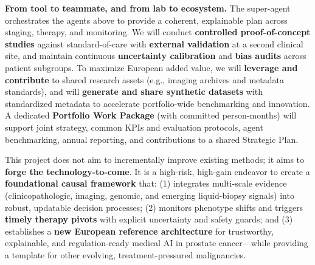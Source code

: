 \documentclass[11pt, a4paper]{article}
\begin{document}
\textbf{From tool to teammate, and from lab to ecosystem.} The super-agent orchestrates the agents above to provide a coherent, explainable plan across staging, therapy, and monitoring. We will conduct \textbf{controlled proof-of-concept studies} against standard-of-care with \textbf{external validation} at a second clinical site, and maintain continuous \textbf{uncertainty calibration} and \textbf{bias audits} across patient subgroups. To maximize European added value, we will \textbf{leverage and contribute} to shared research assets (e.g., imaging archives and metadata standards), and will \textbf{generate and share synthetic datasets} with standardized metadata to accelerate portfolio-wide benchmarking and innovation. A dedicated \textbf{Portfolio Work Package} (with committed person-months) will support joint strategy, common KPIs and evaluation protocols, agent benchmarking, annual reporting, and contributions to a shared Strategic Plan.

This project does not aim to incrementally improve existing methods; it aims to \textbf{forge the technology-to-come}. It is a high-risk, high-gain endeavor to create a \textbf{foundational causal framework} that: (1) integrates multi-scale evidence (clinicopathologic, imaging, genomic, and emerging liquid-biopsy signals) into robust, updatable decision processes; (2) monitors phenotype shifts and triggers \textbf{timely therapy pivots} with explicit uncertainty and safety guards; and (3) establishes a \textbf{new European reference architecture} for trustworthy, explainable, and regulation-ready medical AI in prostate cancer—while providing a template for other evolving, treatment-pressured malignancies.
\end{document}
